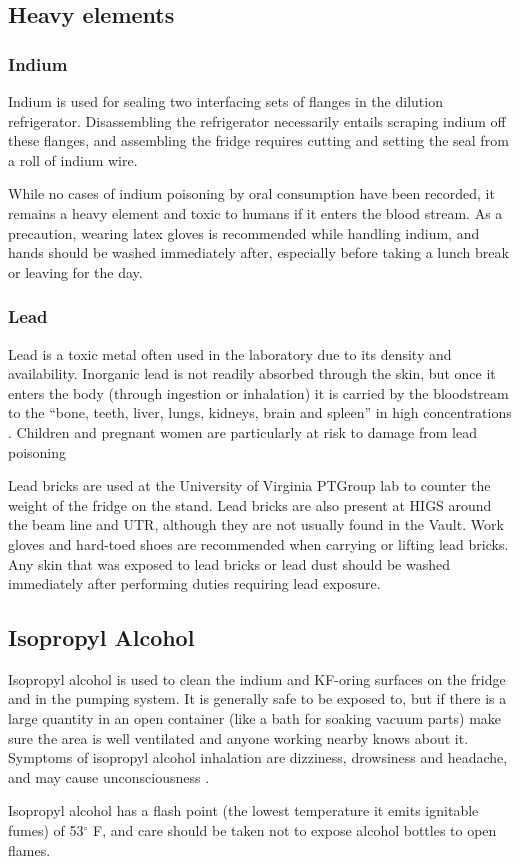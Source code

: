 \subsection{Heavy elements}
\subsubsection{Indium}
Indium is used for sealing two interfacing sets of flanges in the dilution refrigerator.  Disassembling the refrigerator necessarily entails scraping indium off these flanges, and assembling the fridge requires cutting and setting the seal from a roll of indium wire.

While no cases of indium poisoning by oral consumption have been recorded, it remains a heavy element and toxic to humans if it enters the blood stream.  As a precaution, wearing latex gloves is recommended while handling indium, and hands should be washed immediately after, especially before taking a lunch break or leaving for the day.

\subsubsection{Lead}
Lead is a toxic metal often used in the laboratory due to its density and availability.  Inorganic lead is not readily absorbed through the skin, but once it enters the body (through ingestion or inhalation) it is carried by the bloodstream to the ``bone, teeth, liver, lungs, kidneys, brain and spleen'' in high concentrations \cite{aafp98}.  Children and pregnant women are particularly at risk to damage from lead poisoning \cite{epa13}


Lead bricks are used at the University of Virginia PTGroup lab to counter the weight of the fridge on the stand.  Lead bricks are also present at HIGS around the beam line and UTR, although they are not usually found in the Vault.  Work gloves and hard-toed shoes are recommended when carrying or lifting lead bricks.  Any skin that was exposed to lead bricks or lead dust should be washed immediately after performing duties requiring lead exposure.

\subsection{Isopropyl Alcohol}
Isopropyl alcohol is used to clean the indium and KF-oring surfaces on the fridge and in the pumping system.  It is generally safe to be exposed to, but if there is a large quantity in an open container (like a bath for soaking vacuum parts) make sure the area is well ventilated and anyone working nearby knows about it.  Symptoms of isopropyl alcohol inhalation are dizziness, drowsiness and headache, and may cause unconsciousness \cite{isopropmsds}. 

Isopropyl alcohol has a flash point (the lowest temperature it emits ignitable fumes) of 53$^\circ$ F, and care should be taken not to expose alcohol bottles to open flames.